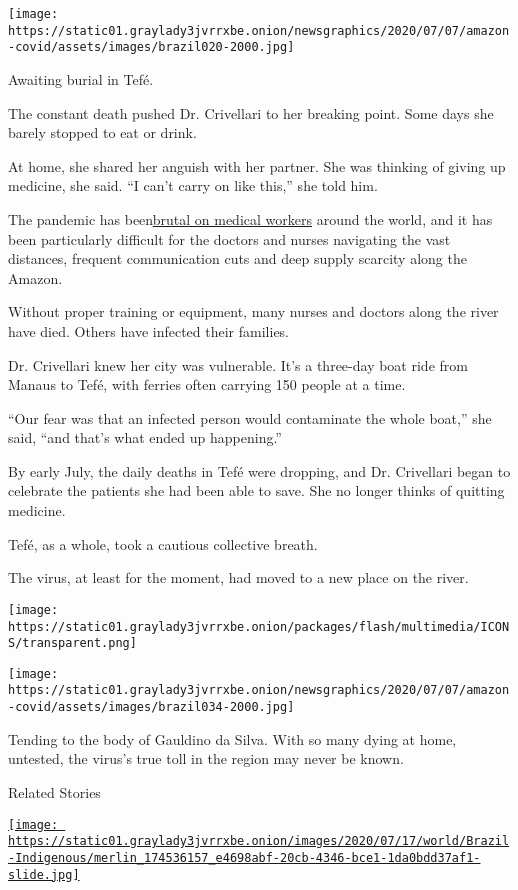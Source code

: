 \texttt{[image: https://static01.graylady3jvrrxbe.onion/newsgraphics/2020/07/07/amazon-covid/assets/images/brazil020-2000.jpg]}

Awaiting burial in Tefé.

The constant death pushed Dr. Crivellari to her breaking point. Some
days she barely stopped to eat or drink.

At home, she shared her anguish with her partner. She was thinking of
giving up medicine, she said. ``I can't carry on like this,'' she told
him.

The pandemic has
been\href{https://www.nytimes3xbfgragh.onion/2020/05/28/world/americas/virus-mexico-doctors.html}{}\href{https://www.nytimes3xbfgragh.onion/2020/05/28/world/americas/virus-mexico-doctors.html}{brutal
on medical workers} around the world, and it has been particularly
difficult for the doctors and nurses navigating the vast distances,
frequent communication cuts and deep supply scarcity along the Amazon.

Without proper training or equipment, many nurses and doctors along the
river have died. Others have infected their families.

Dr. Crivellari knew her city was vulnerable. It's a three-day boat ride
from Manaus to Tefé, with ferries often carrying 150 people at a time.

``Our fear was that an infected person would contaminate the whole
boat,'' she said, ``and that's what ended up happening.''

By early July, the daily deaths in Tefé were dropping, and Dr.
Crivellari began to celebrate the patients she had been able to save.
She no longer thinks of quitting medicine.

Tefé, as a whole, took a cautious collective breath.

The virus, at least for the moment, had moved to a new place on the
river.

\texttt{[image: https://static01.graylady3jvrrxbe.onion/packages/flash/multimedia/ICONS/transparent.png]}

\texttt{[image: https://static01.graylady3jvrrxbe.onion/newsgraphics/2020/07/07/amazon-covid/assets/images/brazil034-2000.jpg]}

Tending to the body of Gauldino da Silva. With so many dying at home,
untested, the virus's true toll in the region may never be known.

Related Stories

\href{https://www.nytimes3xbfgragh.onion/2020/07/19/world/americas/coronavirus-brazil-indigenous.html}{\texttt{[image: https://static01.graylady3jvrrxbe.onion/images/2020/07/17/world/Brazil-Indigenous/merlin\_174536157\_e4698abf-20cb-4346-bce1-1da0bdd37af1-slide.jpg]}}

